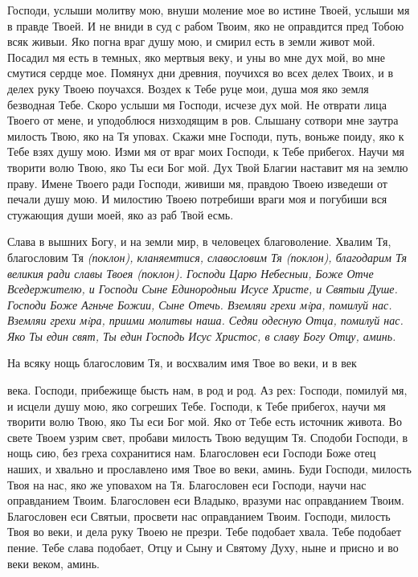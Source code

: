    Господи, услыши молитву мою, внуши моление мое во истине Твоей,
услыши мя в правде Твоей. И не вниди в суд с рабом Твоим, яко не
оправдится пред Тобою всяк живыи. Яко погна враг душу мою, и смирил
есть в земли живот мой. Посадил мя есть в темных, яко мертвыя веку, и уны
во мне дух мой, во мне смутися сердце мое. Помянух дни древния, поучихся
во всех делех Твоих, и в делех руку Твоею поучахся. Воздех к Тебе
руце мои, душа моя яко земля безводная Тебе. Скоро услыши мя
Господи, исчезе дух мой. Не отврати лица Твоего от мене, и уподоблюся
низходящим в ров. Слышану сотвори мне заутра милость Твою, яко на Тя
уповах. Скажи мне Господи, путь, воньже поиду, яко к Тебе взях душу
мою. Изми мя от враг моих Господи, к Тебе прибегох. Научи мя
творити волю Твою, яко Ты еси Бог мой. Дух Твой Благии наставит мя
на землю праву. Имене Твоего ради Господи, живиши мя, правдою
Твоею изведеши от печали душу мою. И милостию Твоею потребиши
враги моя и погубиши вся стужающия души моей, яко аз раб Твой
есмь.


   Слава в вышних Богу, и на земли мир, в человецех благоволение.
Хвалим Тя, благословим Тя \itshape (поклон)\normalfont{}, кланяемтися, славословим
Тя \itshape (поклон)\normalfont{}, благодарим Тя великия ради славы Твоея \itshape (поклон)\normalfont{}.
Господи Царю Небесныи, Боже Отче Вседержителю, и Господи Сыне
Единородныи Исусе Христе, и Святыи Душе. Господи Боже Агньче
Божии, Сыне Отечь. Вземляи грехи мiра, помилуй нас. Вземляи грехи
мiра, приими молитвы наша. Седяи одесную Отца, помилуй нас. Яко
Ты един свят, Ты един Господь Исус Христос, в славу Богу Отцу,
аминь.


   На всяку нощь благословим Тя, и восхвалим имя Твое во веки, и в век

века. Господи, прибежище бысть нам, в род и род. Аз рех: Господи, помилуй
мя, и исцели душу мою, яко согреших Тебе. Господи, к Тебе прибегох, научи
мя творити волю Твою, яко Ты еси Бог мой. Яко от Тебе есть источник
живота. Во свете Твоем узрим свет, пробави милость Твою ведущим Тя.
Сподоби Господи, в нощь сию, без греха сохранитися нам. Благословен еси
Господи Боже отец наших, и хвально и прославлено имя Твое во веки,
аминь. Буди Господи, милость Твоя на нас, яко же уповахом на Тя.
Благословен еси Господи, научи нас оправданием Твоим. Благословен еси
Владыко, вразуми нас оправданием Твоим. Благословен еси Святыи,
просвети нас оправданием Твоим. Господи, милость Твоя во веки, и дела
руку Твоею не презри. Тебе подобает хвала. Тебе подобает пение. Тебе слава
подобает, Отцу и Сыну и Святому Духу, ныне и присно и во веки веком,
аминь.


